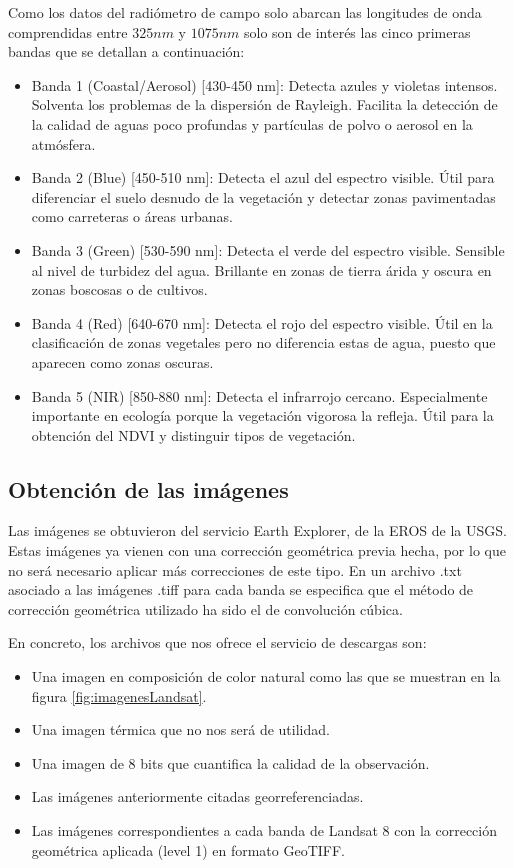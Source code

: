 Como los datos del radiómetro de campo solo abarcan las longitudes de onda comprendidas entre $325 nm$ y $1075 nm$ solo son de interés las cinco primeras bandas que se detallan a continuación:

\begin{itemize}
	\item Banda 1 (Coastal/Aerosol) [430-450 nm]: Detecta azules y violetas intensos. Solventa los problemas de la dispersión de Rayleigh. Facilita la detección de la calidad de aguas poco profundas y partículas de polvo o aerosol en la atmósfera.
	\item Banda 2 (Blue) [450-510 nm]: Detecta el azul del espectro visible. Útil para diferenciar el suelo desnudo de la vegetación y detectar zonas pavimentadas como carreteras o áreas urbanas.
	\item Banda 3 (Green) [530-590 nm]: Detecta el verde del espectro visible. Sensible al nivel de turbidez del agua. Brillante en zonas de tierra árida y oscura en zonas boscosas o de cultivos.
	\item Banda 4 (Red) [640-670 nm]: Detecta el rojo del espectro visible. Útil en la clasificación de zonas vegetales pero no diferencia estas de agua, puesto que aparecen como zonas oscuras.
	\item Banda 5 (NIR) [850-880 nm]: Detecta el infrarrojo cercano. Especialmente importante en ecología porque la vegetación vigorosa la refleja. Útil para la obtención del \ac{NDVI} y distinguir tipos de vegetación.
\end{itemize}


\subsection{Obtención de las imágenes}
Las imágenes se obtuvieron del servicio Earth Explorer, de la \ac{EROS} de la \ac{USGS}. Estas imágenes ya vienen con una corrección geométrica previa hecha, por lo que no será necesario aplicar más correcciones de este tipo. En un archivo .txt asociado a las imágenes .tiff para cada banda se especifica que el método de corrección geométrica utilizado ha sido el de convolución cúbica.\Sep

En concreto, los archivos que nos ofrece el servicio de descargas son:

\begin{itemize}
	\item Una imagen en composición de color natural como las que se muestran en la figura \ref{fig:imagenesLandsat}.
	\item Una imagen térmica que no nos será de utilidad.
	\item Una imagen de 8 bits que cuantifica la calidad de la observación.
	\item Las imágenes anteriormente citadas georreferenciadas.
	\item Las imágenes correspondientes a cada banda de Landsat 8 con la corrección geométrica aplicada (level 1) en formato GeoTIFF.
\end{itemize}\Sep

